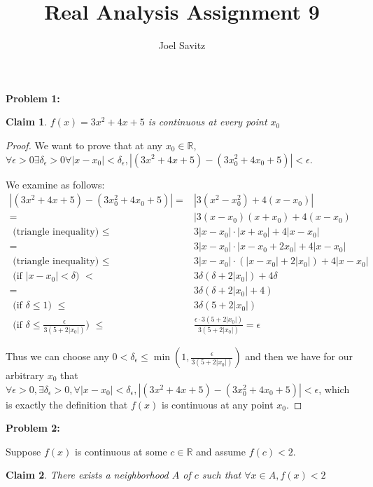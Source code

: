 \documentclass{article}
\title{Real Analysis Assignment 9}
\author{Joel Savitz}
\newcommand{\reals}{\ensuremath{\mathbb{R}}}
\newcommand{\eps}{\ensuremath{\epsilon}}
\newcommand{\pt}[1]{\textrm{ #1 }}
\newtheorem{clm}{Claim}
\begin{document}
\maketitle

\textbf{Problem 1:}

\begin{clm}
	$f(x) = 3x^2 + 4x + 5$ is continuous at every point $x_0$
\end{clm}

\begin{proof}
	We want to prove that at any $x_0 \in \reals$,
	$\forall \eps > 0 \exists \delta_\eps > 0 \forall |x - x_0| < \delta_\eps, |(3x^2 + 4x + 5) - (3x_0^2 + 4x_0 + 5)| < \eps$.

	We examine as follows:
	\begin{align}
		|(3x^2 + 4x + 5) - (3x_0^2 + 4x_0 + 5)| = & |3(x^2 - x_0^2) + 4(x - x_0)| \\
		= & |3(x-x_0)(x+x_0) + 4(x - x_0) \\
		\pt{(triangle inequality)}\le & 3|x-x_0|\cdot|x+x_0| + 4|x - x_0| \\
		= & 3|x-x_0|\cdot|x-x_0 + 2x_0| + 4|x - x_0| \\
		\pt{(triangle inequality)}\le & 3|x-x_0|\cdot(|x-x_0| + 2|x_0|) + 4|x - x_0| \\
		\pt{(if $|x - x_0| < \delta$)} < & 3\delta(\delta + 2|x_0|) + 4\delta \\
		= & 3\delta(\delta + 2|x_0| + 4) \\
		\pt{(if $\delta \le 1$)} \le & 3\delta(5 + 2|x_0|) \\
		\pt{(if $\delta \le \frac{\eps}{3(5 + 2|x_0|)}$)} \le &\frac{\eps \cdot 3(5 + 2|x_0|)}{3(5 + 2|x_0|)} = \eps
	\end{align}

	Thus we can choose any $0 < \delta_\eps \le \min(1, \frac{\eps}{3(5 + 2|x_0|)})$
	and then we have for our arbitrary $x_0$
	that $\forall \eps > 0,
	\exists \delta_\eps > 0,
	\forall |x - x_0| < \delta_\eps,
	|(3x^2 + 4x + 5) - (3x_0^2 + 4x_0 + 5)| < \eps$,
	which is exactly the definition that $f(x)$
	is continuous at any point $x_0$.
\end{proof}

\textbf{Problem 2:}

Suppose $f(x)$ is continuous at some $c \in \reals$ and assume $f(c) < 2$.

\begin{clm}
	There exists a neighborhood $A$ of $c$ such that $\forall x \in A, f(x) < 2$
\end{clm}
\end{document}
